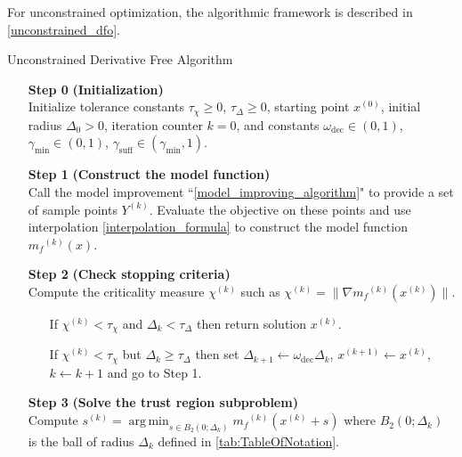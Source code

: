 \documentclass{article}
\theoremstyle{case}
\numberwithin{theorem}{subsection}
\DeclareMathOperator*{\argmin}{arg\,min}
\newcommand{\chik}{{\chi^{(k)}}}
\newcommand{\gammabi}{\gamma_{\textrm{suff}}}
\newcommand{\gammasm}{\gamma_{\textrm{min}}}
\newcommand{\mfk}{{{m}_f}^{(k)}}
\newcommand{\omegadec}{\omega_{\text{dec}}}
\newcommand{\sk}{{{s}^{(k)}}}
\newcommand{\xk}{x^{(k)}}
\newcommand{\xinit}{{x^{(0)}}}
\begin{document}
For unconstrained optimization, the algorithmic framework is described in \cref{unconstrained_dfo}.

\begin{algorithm}[H]
    \caption{Unconstrained Derivative Free Algorithm}
    \label{unconstrained_dfo}
    \begin{itemize}
        \item[\textbf{Step 0}] \textbf{(Initialization)} \\
            Initialize tolerance constants $\tau_{\chi} \ge 0$, $\tau_{\Delta} \ge 0$, starting point $\xinit$, initial radius $\Delta_0 > 0$, iteration counter $k=0$, and constants $\omegadec \in (0, 1)$, $ \gammasm \in (0, 1)$, $\gammabi \in (\gammasm, 1)$.
            
        \item[\textbf{Step 1}] \textbf{(Construct the model function)} \\
            Call the model improvement ``\cref{model_improving_algorithm}" to provide a set of sample points $Y^{(k)}$.
            Evaluate the objective on these points and use interpolation \cref{interpolation_formula} to construct the model function $\mfk(x)$.
        
        \item[\textbf{Step 2}] \textbf{(Check stopping criteria)} \\
            Compute the criticality measure $\chik$ such as $\chik = \|\nabla\mfk(\xk)\|$. \begin{itemize}
                \item[] If $ \chik < \tau_{\chi} $ and $\Delta_k<\tau_{\Delta}$ then return solution $\xk$.
                \item[] If $ \chik < \tau_{\chi} $ but $\Delta_k\ge\tau_{\Delta}$ then  
                set $\Delta_{k+1} \gets \omegadec\Delta_{k}$, 
                $x^{(k+1)} \gets \xk$,
                $k \gets k+1$ and go to Step 1.
            \end{itemize}
        
        \item[\textbf{Step 3}] \textbf{(Solve the trust region subproblem)} \\
            Compute $\sk = \argmin_{s\in B_2(0; \Delta_k)} \mfk (\xk + s)$ where $B_2(0; \Delta_k)$ is the ball of radius $\Delta_k$ defined in \cref{tab:TableOfNotation}.
            

\end{itemize}
\end{algorithm}
\end{document}
